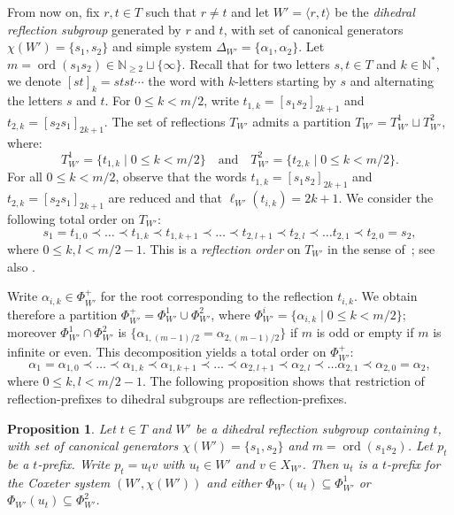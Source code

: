 \documentclass{amsart}
\newtheorem{Proposition}[Theorem]{Proposition}
\theoremstyle{definition}
\newcommand{\ord}{\operatorname{ord}}
\begin{document}
 From now on, fix  $r,t\in T$ such that $r\not =t$ and let  $W'=\langle r,t\rangle$ be the {\em dihedral reflection subgroup} generated by $r$ and $t$, with set of canonical generators $\chi(W')=\{s_1,s_2\}$ and simple system $\Delta_{W'}=\{\alpha_1,\alpha_2\}$. Let $m=\ord(s_1 s_2)\in \mathbb N_{\geq 2}\sqcup\{\infty\}$. Recall that for two letters $s,t\in T$ and $k\in \mathbb N^*$, we denote $[st]_k=stst\cdots$ the word with $k$-letters starting by $s$ and alternating the letters $s$ and $t$. For $0\leq k< m/2$, write $t_{1,k}=[s_1s_2]_{2k+1}$ and $t_{2,k}=[s_2s_1]_{2k+1}$. The set of reflections $T_{W'}$ admits a partition $T_{W'}=T_{W'}^1 \sqcup T_{W'}^2$, where:
$$
T_{W'}^1=\{t_{1,k}\mid 0\leq k < m/2\} \quad\textrm{and}\quad T_{W'}^2=\{t_{2,k}\mid 0\leq k < m/2\}.
$$
For  all $0\leq k < m/2$, observe that the words $t_{1,k}=[s_1s_2]_{2k+1}$ and $t_{2,k}=[s_2s_1]_{2k+1}$ are reduced and that $\ell_{W'}(t_{i,k})=2k+1$. We consider the following total order on $T_{W'}$:
$$
s_1=t_{1,0}\prec \dots \prec t_{1,k}\prec t_{1,k+1} \prec\dots \prec  t_{2,l+1} \prec t_{2,l}\prec \dots t_{2,1}\prec t_{2,0}=s_2,
$$
where $0\leq k,l < m/2-1$. This is a {\em reflection order} on $T_{W'}$ in the sense of~\cite[Definition~2.1]{Dy92}; see also \cite[\S5.2]{BB}.

Write $\alpha_{i,k}\in \Phi^+_{W'}$ for the root corresponding to the reflection $t_{i,k}$. We obtain therefore a partition $\Phi^+_{W'}=\Phi_{W'}^1 \cup \Phi_{W'}^2$, where $\Phi^i_{W'}=\{\alpha_{i,k}\mid 0\leq k<m/2\}$; moreover $\Phi_{W'}^1\cap\Phi_{W'}^2$ is $\{ \alpha_{1,(m-1)/2}=\alpha_{2,(m-1)/2}\}$ if $m$ is odd or empty  if $m$ is infinite or even. This decomposition yields a total order on $\Phi^+_{W'}$:
\begin{equation}
\label{eq:InitialSection}
\alpha_1=\alpha_{1,0}\prec \dots \prec \alpha_{1,k}\prec \alpha_{1,k+1} \prec\dots \prec  \alpha_{2,l+1} \prec \alpha_{2,l}\prec \dots \alpha_{2,1}\prec \alpha_{2,0}=\alpha_2,
\end{equation}
where $0\leq k,l < m/2-1$. The following proposition shows that restriction of reflection-prefixes to dihedral subgroups are reflection-prefixes. 


 
\begin{Proposition}\label{prop:PrefDihed} Let $t\in T$ and $W'$ be a dihedral reflection subgroup containing $t$, with set of canonical generators $\chi(W')=\{s_1,s_2\}$ and $m=\ord(s_1 s_2)$. Let $p_t$ be a $t$-prefix. Write $p_t=u_t v$ with $u_t\in W'$ and $v\in X_{W'}$. Then $u_t$ is a $t$-prefix for the Coxeter system $(W',\chi(W'))$ and either $\Phi_{W'}(u_t)\subseteq \Phi_{W'}^1$ or $\Phi_{W'}(u_t)\subseteq \Phi_{W'}^2$.
 \end{Proposition}
\end{document}
